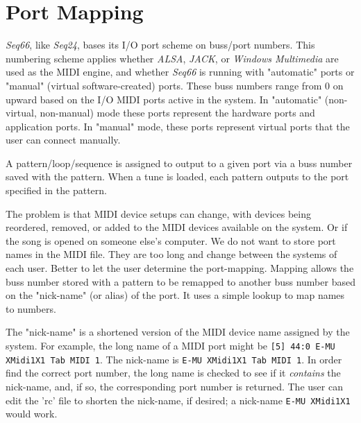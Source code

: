 %
%
%

\section{Port Mapping}
\label{sec:port_mapping}

   \textsl{Seq66}, like \textsl{Seq24}, bases its I/O port scheme on buss/port
   numbers.
   This numbering scheme applies whether
   \textsl{ALSA}, \textsl{JACK}, or \textsl{Windows Multimedia}
   are used as the MIDI engine, and whether \textsl{Seq66} is running with
   "automatic" ports or "manual" (virtual software-created) ports.
   These buss numbers range from 0 on upward
   based on the I/O MIDI ports active in the system.
   In "automatic" (non-virtual, non-manual) mode
   these ports represent the hardware ports and application ports.
   In "manual" mode, these ports represent virtual ports that the user
   can connect manually.

   A pattern/loop/sequence is assigned to output to a given port via
   a buss number saved with the pattern.  When a tune is loaded,
   each pattern outputs to the port specified in the pattern.

   The problem is that MIDI device setups can change, with devices being
   reordered, removed, or added to the MIDI devices available on the system.
   Or if the song is opened on someone else's computer.
   We do not want to store port names in the MIDI file.
   They are too long and change between the systems of each user.
   Better to let the user determine the port-mapping.
   Mapping allows the buss number stored with a pattern to be
   remapped to another buss number based on the "nick-name" (or alias)
   of the port.
   It uses a simple lookup to map names to numbers.

   The "nick-name" is a shortened version of the MIDI device name assigned
   by the system.
   For example, the long name of a MIDI port might be
   \texttt{[5] 44:0 E-MU XMidi1X1 Tab MIDI 1}.
   The nick-name is \texttt{E-MU XMidi1X1 Tab MIDI 1}.
   In order find the correct port number, the long name is checked to see if it
   \textsl{contains} the nick-name, and, if so, the corresponding port number is
   returned.  The user can edit the 'rc' file to shorten the nick-name, if
   desired; a nick-name \texttt{E-MU XMidi1X1} would work.

